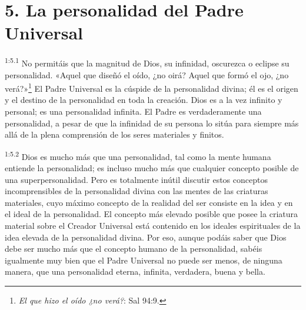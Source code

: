 \section*{5. La personalidad del Padre Universal}
\par
\textsuperscript{1:5.1} No permitáis que la magnitud de Dios, su infinidad, oscurezca o eclipse su personalidad. «Aquel que diseñó el oído, ¿no oirá? Aquel que formó el ojo, ¿no verá?»\footnote{\textit{El que hizo el oído ¿no verá?}: Sal 94:9.} El Padre Universal es la cúspide de la personalidad divina; él es el origen y el destino de la personalidad en toda la creación. Dios es a la vez infinito y personal; es una personalidad infinita. El Padre es verdaderamente una personalidad, a pesar de que la infinidad de su persona lo sitúa para siempre más allá de la plena comprensión de los seres materiales y finitos.

\par
\textsuperscript{1:5.2} Dios es mucho más que una personalidad, tal como la mente humana entiende la personalidad; es incluso mucho más que cualquier concepto posible de una superpersonalidad. Pero es totalmente inútil discutir estos conceptos incomprensibles de la personalidad divina con las mentes de las criaturas materiales, cuyo máximo concepto de la realidad del ser consiste en la idea y en el ideal de la personalidad. El concepto más elevado posible que posee la criatura material sobre el Creador Universal está contenido en los ideales espirituales de la idea elevada de la personalidad divina. Por eso, aunque podáis saber que Dios debe ser mucho más que el concepto humano de la personalidad, sabéis igualmente muy bien que el Padre Universal no puede ser menos, de ninguna manera, que una personalidad eterna, infinita, verdadera, buena y bella.

